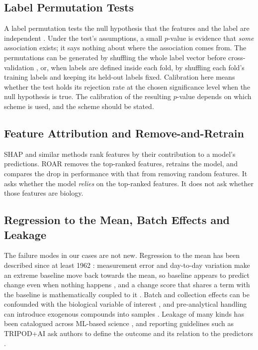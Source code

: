 \documentclass[conference]{IEEEtran}
\begin{document}
\subsection{Label Permutation Tests}
A label permutation tests the null hypothesis that the features and the
label are independent \cite{ojala2010}. Under the test's assumptions, a small
$p$-value is evidence that \emph{some} association exists; it says nothing
about where the association comes from. The permutations can be generated by
shuffling the whole label vector before cross-validation \cite{ojala2010},
or, when labels are defined inside each fold, by shuffling each fold's
training labels and keeping its held-out labels fixed. Calibration here
means whether the test holds its rejection rate at the chosen significance
level when the null hypothesis is true. The calibration of the resulting
$p$-value depends on which scheme is used, and the scheme should be
stated.

\subsection{Feature Attribution and Remove-and-Retrain}
SHAP and similar methods rank features by their contribution to a model's
predictions. ROAR \cite{hooker2019} removes the top-ranked features, retrains
the model, and compares the drop in performance with that from removing
random features. It asks whether the model \emph{relies} on the top-ranked
features. It does not ask whether those features are biology.

\subsection{Regression to the Mean, Batch Effects and Leakage}
The failure modes in our cases are not new. Regression to the mean has been
described since at least 1962 \cite{oldham1962}: measurement error and
day-to-day variation make an extreme baseline move back towards the mean, so
baseline appears to predict change even when nothing happens
\cite{barnett2005, tu2007}, and a change score that shares a term with the
baseline is mathematically coupled to it \cite{archie1981}. Batch and
collection effects can be confounded with the biological variable of
interest \cite{leek2010, han2022}, and pre-analytical handling can introduce
exogenous compounds into samples \cite{bernini2011, vandersar2015}. Leakage
of many kinds has been catalogued across ML-based science \cite{kapoor2023},
and reporting guidelines such as TRIPOD+AI ask authors to define the outcome
and its relation to the predictors \cite{collins2024}.
\end{document}
